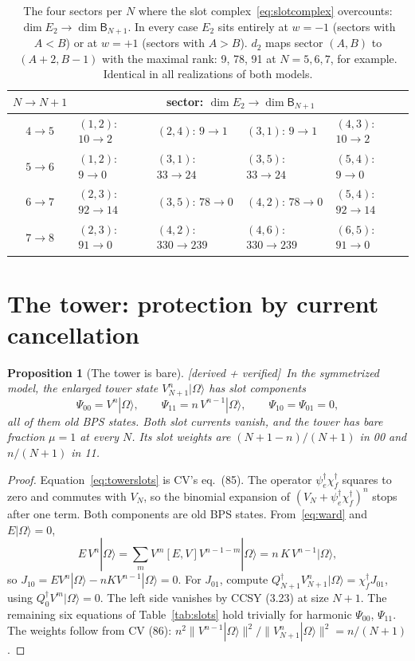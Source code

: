\documentclass[11pt]{article}
\newcommand{\B}{\mathsf B}
\newcommand{\psie}{\psi_e}
\newcommand{\chif}{\chi_f}
\newcommand{\Om}{|\Omega\rangle}
\newcommand{\tagbox}[2]{\textsf{\small\color{#1}[#2]}}
\newcommand{\VER}{\tagbox{cder}{derived + verified}}
\theoremstyle{plain}
\newtheorem{proposition}{Proposition}
\theoremstyle{remark}
\numberwithin{equation}{section}
\begin{document}
\begin{table}[ht]
\centering\small
\caption{The four sectors per $N$ where the slot complex~\eqref{eq:slotcomplex} overcounts: $\dim E_2\to\dim\B_{N+1}$.
In every case $E_2$ sits entirely at $w=-1$ (sectors with $A<B$) or at $w=+1$ (sectors with $A>B$). $d_2$ maps
sector $(A,B)$ to $(A+2,B-1)$ with the maximal rank: 9, 78, 91 at $N=5,6,7$, for example. Identical in all
realizations of both models.}\label{tab:d2}
\begin{tabular}{@{}cllll@{}}\toprule
$N\to N+1$ & \multicolumn{4}{c}{sector: $\dim E_2\to\dim\B_{N+1}$}\\\midrule
$4\to5$ & $(1,2)$: $10\to2$ & $(2,4)$: $9\to1$ & $(3,1)$: $9\to1$ & $(4,3)$: $10\to2$\\
$5\to6$ & $(1,2)$: $9\to0$ & $(3,1)$: $33\to24$ & $(3,5)$: $33\to24$ & $(5,4)$: $9\to0$\\
$6\to7$ & $(2,3)$: $92\to14$ & $(3,5)$: $78\to0$ & $(4,2)$: $78\to0$ & $(5,4)$: $92\to14$\\
$7\to8$ & $(2,3)$: $91\to0$ & $(4,2)$: $330\to239$ & $(4,6)$: $330\to239$ & $(6,5)$: $91\to0$\\\bottomrule
\end{tabular}
\end{table}

\section{The tower: protection by current cancellation}\label{sec:tower}

\begin{proposition}[The tower is bare]\label{prop:tower}\VER\
In the symmetrized model, the enlarged tower state $V_{N+1}^n\Om$ has slot components
\begin{equation}\label{eq:towerslots}
\Psi_{00}=V^n\Om,\qquad \Psi_{11}=n\,V^{n-1}\Om,\qquad \Psi_{10}=\Psi_{01}=0,
\end{equation}
all of them old BPS states. Both slot currents vanish, and the tower has bare fraction $\mu=1$ at every $N$. Its slot
weights are $(N+1-n)/(N+1)$ in 00 and $n/(N+1)$ in 11.
\end{proposition}
\begin{proof}
Equation~\eqref{eq:towerslots} is CV's eq.~(85). The operator $\psie^\dagger\chif^\dagger$ squares to zero and
commutes with $V_N$, so the binomial expansion of $(V_N+\psie^\dagger\chif^\dagger)^n$ stops after one term. Both
components are old BPS states. From~\eqref{eq:ward} and $E\Om=0$,
\begin{equation}\label{eq:EVn}
E\,V^n\Om=\sum_{m}V^m[E,V]V^{n-1-m}\Om=n\,K\,V^{n-1}\Om ,
\end{equation}
so $J_{10}=EV^n\Om-nKV^{n-1}\Om=0$. For $J_{01}$, compute $Q_{N+1}^\dagger V_{N+1}^n\Om=\chif^\dagger J_{01}$, using
$Q_0^\dagger V^m\Om=0$. The left side vanishes by CCSY (3.23) at size $N+1$. The remaining six equations of
Table~\ref{tab:slots} hold trivially for harmonic $\Psi_{00}$, $\Psi_{11}$. The weights follow from CV (86):
$n^2\|V^{n-1}\Om\|^2/\|V^n_{N+1}\Om\|^2=n/(N+1)$.
\end{proof}
\end{document}
